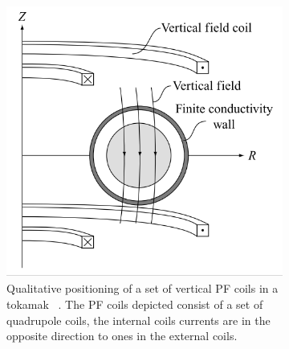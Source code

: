   \begin{figure}
  	\centering
  	\begin{subfigure}[b]{0.39\textwidth}
  		\includegraphics[width=\textwidth]{Chp1/PFcoils.png}
  		\caption{ Qualitative positioning of a set of vertical PF coils in a tokamak ~\cite[Chapter~11]{Freidberg2007}. The PF coils depicted consist of a set of quadrupole coils,  the internal coils currents are in the opposite direction to ones in the external coils. \label{} }
  	\end{subfigure}
  	~~
  	\begin{subfigure}[b]{0.39\textwidth}

\end{subfigure}
\end{figure}
